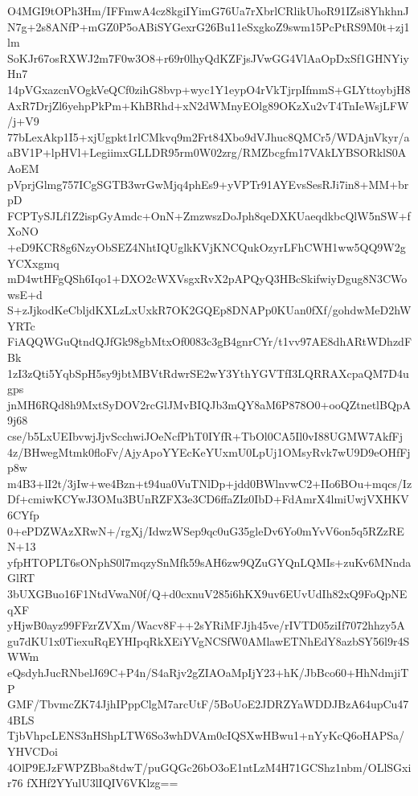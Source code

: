 O4MGI9tOPh3Hm/IFFmwA4cz8kgiIYimG76Ua7rXbrlCRlikUhoR91IZsi8YhkhnJ
N7g+2s8ANfP+mGZ0P5oABiSYGexrG26Bu11eSxgkoZ9swm15PcPtRS9M0t+zj1lm
SoKJr67osRXWJ2m7F0w3O8+r69r0lhyQdKZFjsJVwGG4VlAaOpDxSf1GHNYiyHn7
14pVGxazcnVOgkVeQCf0zihG8bvp+wyc1Y1eypO4rVkTjrpIfmmS+GLYttoybjH8
AxR7DrjZl6yehpPkPm+KhBRhd+xN2dWMnyEOlg89OKzXu2vT4TnIeWsjLFW/j+V9
77bLexAkp1I5+xjUgpkt1rlCMkvq9m2Frt84Xbo9dVJhuc8QMCr5/WDAjnVkyr/a
aBV1P+lpHVl+LegiimxGLLDR95rm0W02zrg/RMZbcgfm17VAkLYBSORklS0AAoEM
pVprjGlmg757ICgSGTB3wrGwMjq4phEs9+yVPTr91AYEvsSesRJi7in8+MM+brpD
FCPTySJLf1Z2ispGyAmdc+OnN+ZmzwszDoJph8qeDXKUaeqdkbcQlW5nSW+fXoNO
+eD9KCR8g6NzyObSEZ4NhtIQUglkKVjKNCQukOzyrLFhCWH1ww5QQ9W2gYCXxgmq
mD4wtHFgQSh6Iqo1+DXO2cWXVsgxRvX2pAPQyQ3HBcSkifwiyDgug8N3CWowsE+d
S+zJjkodKeCbljdKXLzLxUxkR7OK2GQEp8DNAPp0KUan0fXf/gohdwMeD2hWYRTc
FiAQQWGuQtndQJfGk98gbMtxOf0083c3gB4gnrCYr/t1vv97AE8dhARtWDhzdFBk
1zI3zQti5YqbSpH5sy9jbtMBVtRdwrSE2wY3YthYGVTfI3LQRRAXcpaQM7D4ugps
jnMH6RQd8h9MxtSyDOV2rcGlJMvBIQJb3mQY8aM6P878O0+ooQZtnetlBQpA9j68
cse/b5LxUEIbvwjJjvScchwiJOeNcfPhT0IYfR+TbOl0CA5Il0vI88UGMW7AkfFj
4z/BHwegMtmk0floFv/AjyApoYYEcKeYUxmU0LpUj1OMsyRvk7wU9D9eOHfFjp8w
m4B3+lI2t/3jIw+we4Bzn+t94ua0VuTNlDp+jdd0BWlnvwC2+IIo6BOu+mqcs/Iz
Df+cmiwKCYwJ3OMu3BUnRZFX3e3CD6ffaZIz0IbD+FdAmrX4lmiUwjVXHKV6CYfp
0+ePDZWAzXRwN+/rgXj/IdwzWSep9qc0uG35gleDv6Yo0mYvV6on5q5RZzREN+13
yfpHTOPLT6sONphS0l7mqzySnMfk59sAH6zw9QZuGYQnLQMIs+zuKv6MNndaGlRT
3bUXGBuo16F1NtdVwaN0f/Q+d0cxnuV285i6hKX9uv6EUvUdIh82xQ9FoQpNEqXF
yHjwB0ayz99FFzrZVXm/Wacv8F++2sYRiMFJjh45ve/rIVTD05ziIf7072hhzy5A
gu7dKU1x0TiexuRqEYHIpqRkXEiYVgNCSfW0AMlawETNhEdY8azbSY56l9r4SWWm
eQsdyhJucRNbelJ69C+P4n/S4aRjv2gZIAOaMpIjY23+hK/JbBco60+HhNdmjiTP
GMF/TbvmcZK74JjhIPppClgM7arcUtF/5BoUoE2JDRZYaWDDJBzA64upCu474BLS
TjbVhpcLENS3nHShpLTW6So3whDVAm0cIQSXwHBwu1+nYyKcQ6oHAPSa/YHVCDoi
4OlP9EJzFWPZBba8tdwT/puGQGc26bO3oE1ntLzM4H71GCShz1nbm/OLlSGxir76
fXHf2YYulU3lIQIV6VKlzg==
